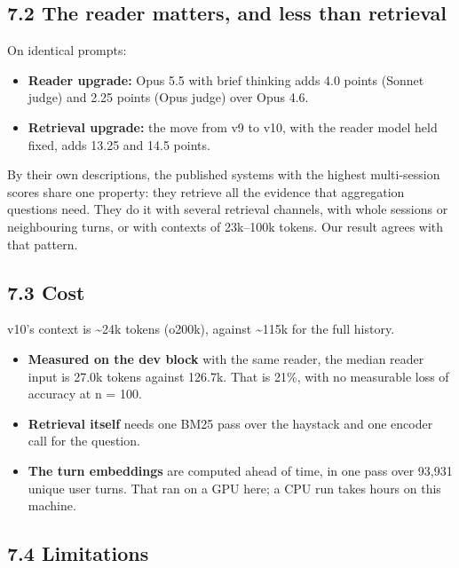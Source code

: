 \documentclass[11pt]{article}
\providecommand{\tightlist}{\setlength{\itemsep}{0pt}\setlength{\parskip}{0pt}}
\begin{document}
\hypertarget{the-reader-matters-and-less-than-retrieval}{%
\subsection{7.2 The reader matters, and less than retrieval}\label{the-reader-matters-and-less-than-retrieval}}

On identical prompts:

\begin{itemize}
\tightlist
\item
  \textbf{Reader upgrade:} Opus 5.5 with brief thinking adds 4.0 points (Sonnet judge) and 2.25 points (Opus
  judge) over Opus 4.6.
\item
  \textbf{Retrieval upgrade:} the move from v9 to v10, with the reader model held fixed, adds 13.25 and 14.5
  points.
\end{itemize}

By their own descriptions, the published systems with the highest multi-session scores share one property:
they retrieve all the evidence that aggregation questions need. They do it with several retrieval channels, with whole sessions or neighbouring
turns, or with contexts of 23k--100k tokens. Our result agrees with that pattern.

\hypertarget{cost}{%
\subsection{7.3 Cost}\label{cost}}

v10's context is \textasciitilde24k tokens (o200k), against \textasciitilde115k for the full history.

\begin{itemize}
\tightlist
\item
  \textbf{Measured on the dev block} with the same reader, the median reader input is 27.0k tokens against
  126.7k. That is 21\%, with no measurable loss of accuracy at n = 100.
\item
  \textbf{Retrieval itself} needs one BM25 pass over the haystack and one encoder call for the question.
\item
  \textbf{The turn embeddings} are computed ahead of time, in one pass over 93,931 unique user turns. That ran on a
  GPU here; a CPU run takes hours on this machine.
\end{itemize}

\hypertarget{limitations}{%
\subsection{7.4 Limitations}\label{limitations}}
\end{document}
